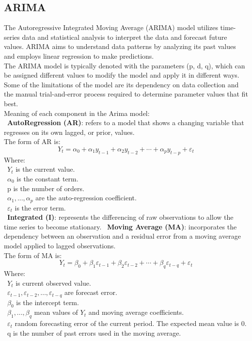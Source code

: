 \documentclass{ieeeojies}
\begin{document}
	\subsection{ARIMA}
	The Autoregressive Integrated Moving Average (ARIMA) \cite{b8} model utilizes time-series data and statistical analysis to interpret the data and forecast future values. ARIMA aims to understand data patterns by analyzing its past values and employs linear regression to make predictions.\\
	The ARIMA model is typically denoted with the parameters (p, d, q), which can be assigned different values to modify the model and apply it in different ways.\\
	Some of the limitations of the model are its dependency on data collection and the manual trial-and-error process required to determine parameter values that fit best. \\
	Meaning of each component in the Arima model:\\
	\indent \textbullet\ \textbf{AutoRegression (AR)}: refers to a model that shows a changing variable that regresses on its own lagged, or prior, values.\\
	The form of AR is: 
	\[Y_t=\alpha_0+\alpha_1 y_{t-1}+\alpha_2 y_{t-2}+\cdots+\alpha_p y_{t-p}+\varepsilon_t\]
	Where:\\
	\indent\textbullet\ \(Y_t\) is the current value.\\
	\indent\textbullet\ \(\alpha_0\) is the constant term.\\
	\indent\textbullet\ p is the number of orders.\\
	\indent\textbullet\ \(\alpha_1,..., \alpha_p\) are the auto-regression coefficient.\\
	\indent\textbullet\ \(\varepsilon_t\) is the error term.\\
	
	\indent \textbullet\ \textbf{Integrated (I)}: represents the differencing of raw observations to allow the time series to become stationary.
	\indent \textbullet\ \textbf{Moving Average (MA)}: incorporates the dependency between an observation and a residual error from a moving average model applied to lagged observations.\\
	The form of MA is:
	\[Y_t=\beta_0+\beta_1 \varepsilon_{t-1}+\beta_2 \varepsilon_{t-2}+\cdots+\beta_q \varepsilon_{t-q}+\varepsilon_t\]
	Where:\\
	\indent\textbullet\ \(Y_t\) is current observed value.\\
	\indent\textbullet\ \(\varepsilon_{t-1}, \varepsilon_{t-2}, \ldots, \varepsilon_{t-q}\) are forecast error.\\
	\indent\textbullet\ \(\beta_0\) is the intercept term.\\
	\indent\textbullet\ \(\beta_1,..., \beta_q\) mean values of \(Y_t\) and moving average coefficients.\\
	\indent\textbullet\ \(\varepsilon_{t}\) random forecasting error of the current period. The expected mean value is 0.\\
	\indent\textbullet\ q is the number of past errors used in the moving average.
	
\end{document}
